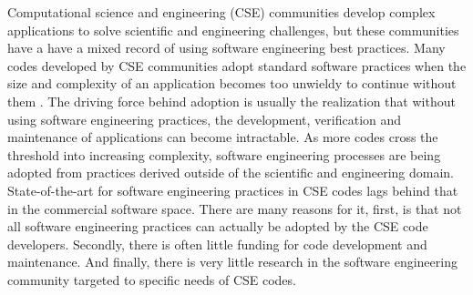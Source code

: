 \label{sec:introduction}
Computational science and engineering (CSE) communities develop
complex applications to solve scientific and engineering challenges,
but these communities have a have a mixed record of using software
engineering best practices. Many codes developed by CSE communities
adopt standard software practices when the size and complexity of an
application becomes too unwieldy to continue without them
\cite{cc2012}. The driving force behind adoption is usually the
realization that without using software engineering practices, the
development, verification and maintenance of applications can become
intractable. As more codes cross the threshold into increasing
complexity, software engineering processes are being adopted from
practices derived outside of the scientific and engineering domain.
State-of-the-art for software engineering practices in CSE codes lags
behind that in the commercial software space.  There are many reasons for it, first, is
that not all software engineering practices can actually be adopted by
the CSE code developers.  Secondly, there is often little funding for
code development and maintenance. And finally, there is very little
research in the software engineering community targeted to specific
needs of CSE codes. 

